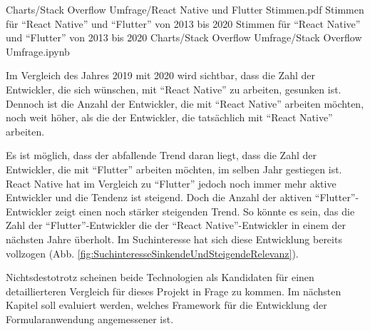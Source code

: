 \begin{alexfigurewithnotebook}{Charts/Stack Overflow Umfrage/React Native und Flutter Stimmen.pdf}
	{Stimmen für \enquote{React Native} und \enquote{Flutter} von 2013 bis 2020}
	{Stimmen für \enquote{React Native} und \enquote{Flutter} von 2013 bis 2020}
	{Charts/Stack Overflow Umfrage/Stack Overflow Umfrage.ipynb}
	{}
	\label{fig:ReactNativeUndFlutterStimmen}

\end{alexfigurewithnotebook}

Im Vergleich des Jahres 2019 mit 2020 wird sichtbar, dass die Zahl der Entwickler, die sich wünschen, mit \enquote{React Native} zu arbeiten, gesunken ist.
Dennoch ist die Anzahl der Entwickler, die mit \enquote{React Native} arbeiten möchten, noch weit höher, als die der Entwickler, die tatsächlich mit \enquote{React Native} arbeiten.

Es ist möglich, dass der abfallende Trend daran liegt, dass die Zahl der Entwickler, die mit \enquote{Flutter} arbeiten möchten, im selben Jahr gestiegen ist.
React Native hat im Vergleich zu \enquote{Flutter} jedoch noch immer mehr aktive Entwickler und die Tendenz ist steigend.
Doch die Anzahl der aktiven \enquote{Flutter}-Entwickler zeigt einen noch stärker steigenden Trend.
So könnte es sein, das die Zahl der \enquote{Flutter}-Entwickler die der \enquote{React Native}-Entwickler in einem der nächsten Jahre überholt.
Im Suchinteresse hat sich diese Entwicklung bereits vollzogen (Abb. \ref{fig:SuchinteresseSinkendeUndSteigendeRelevanz}). 

Nichtsdestotrotz scheinen beide Technologien als Kandidaten für einen detaillierteren Vergleich für dieses Projekt in Frage zu kommen.
Im nächsten Kapitel soll evaluiert werden, welches Framework für die Entwicklung der Formularanwendung angemessener ist.



